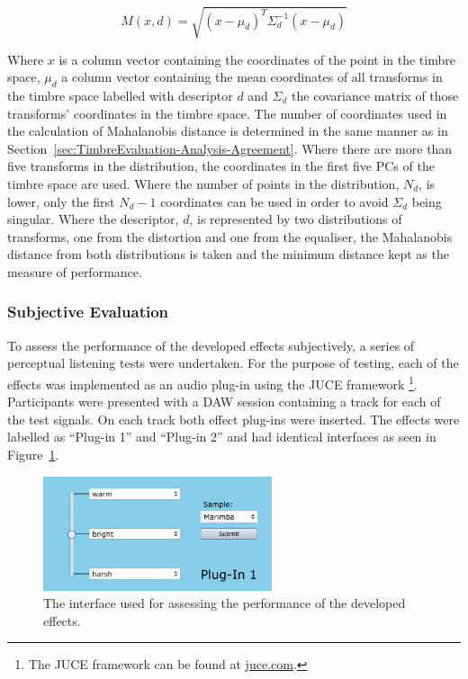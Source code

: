 			\begin{equation}
				M(x, d) = \sqrt{(x - \mu_{d})^{T}\Sigma_{d}^{-1}(x - \mu_{d})}
				\label{eq:Mahalanobis}
			\end{equation}

			Where $x$ is a column vector containing the coordinates of the point in the timbre space, $\mu_{d}$
			a column vector containing the mean coordinates of all transforms in the timbre space labelled with
			descriptor $d$ and $\Sigma_{d}$ the covariance matrix of those transforms' coordinates in the
			timbre space. The number of coordinates used in the calculation of Mahalanobis distance is
			determined in the same manner as in Section~\ref{sec:TimbreEvaluation-Analysis-Agreement}. Where
			there are more than five transforms in the distribution, the coordinates in the first five PCs of
			the timbre space are used. Where the number of points in the distribution, $N_{d}$, is lower, only
			the first $N_{d} - 1$ coordinates can be used in order to avoid $\Sigma_{d}$ being singular. Where
			the descriptor, $d$, is represented by two distributions of transforms, one from the distortion and
			one from the equaliser, the Mahalanobis distance from both distributions is taken and the minimum
			distance kept as the measure of performance.
	
		\subsubsection*{Subjective Evaluation}
			To assess the performance of the developed effects subjectively, a series of perceptual listening
			tests were undertaken. For the purpose of testing, each of the effects was implemented as an audio
			plug-in using the JUCE framework \footnote{The JUCE framework can be found at
			\href{https://juce.com}{juce.com}.}. Participants were presented with a DAW session containing a
			track for each of the test signals. On each track both effect plug-ins were inserted. The effects
			were labelled as ``Plug-in 1'' and ``Plug-in 2'' and had identical interfaces as seen in
			Figure~\ref{fig:TestPlugInterface}.

			\begin{figure}[h!]
				\centering
				\includegraphics[width=0.6\textwidth]{chapter7/Images/TestPlugInInterface.png}
				\caption{The interface used for assessing the performance of the developed effects.}
				\label{fig:TestPlugInterface}
			\end{figure}

